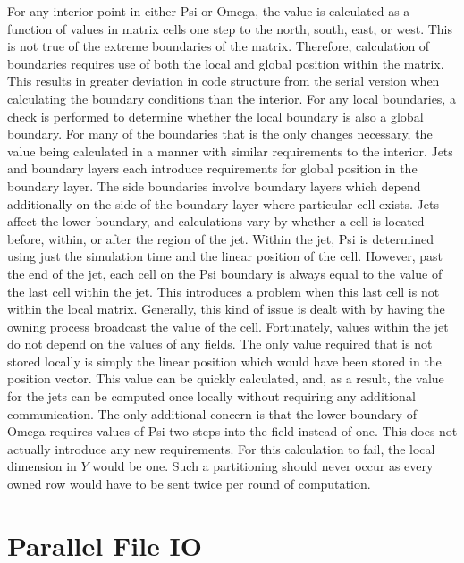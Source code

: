\documentclass[twocolumn]{article}
\begin{document}
For any interior point in either Psi or Omega, the value is calculated
as a function of values in matrix cells one step to the north, south, east, or
west. This is not true of the extreme boundaries of the matrix. Therefore,
calculation of boundaries requires use of both the local and global position
within the matrix. This results in greater deviation in code structure from
the serial version when calculating the boundary conditions than the interior.
For any local boundaries, a check is performed to determine whether the
local boundary is also a global boundary. For many of the boundaries
that is the only changes necessary, the value being calculated in a manner
with similar requirements to the interior. Jets and boundary layers each
introduce requirements for global position in the boundary layer.
The side boundaries involve boundary layers which depend additionally
on the side of the boundary layer where particular cell exists. Jets affect
the lower boundary, and calculations vary by whether a cell is located
before, within, or after the region of the jet. Within the jet, Psi
is determined using just the simulation time and the linear position
of the cell. However, past the end of the jet, each cell on the Psi
boundary is always equal to the value of the last cell within the jet.
This introduces a problem when this last cell is not within the local
matrix. Generally, this kind of issue is dealt with by having the
owning process broadcast the value of the cell. Fortunately, values
within the jet do not depend on the values of any fields. The only
value required that is not stored locally is simply the linear position
which would have been stored in the position vector. This value can
be quickly calculated, and, as a result, the value for the jets can be
computed once locally without requiring any additional communication.
The only additional concern is that the lower boundary of Omega requires
values of Psi two steps into the field instead of one. This does not
actually introduce any new requirements. For this calculation to fail,
the local dimension in $Y$ would be one. Such a partitioning should
never occur as every owned row would have to be sent twice per round
of computation.

\section{Parallel File IO}
\end{document}

